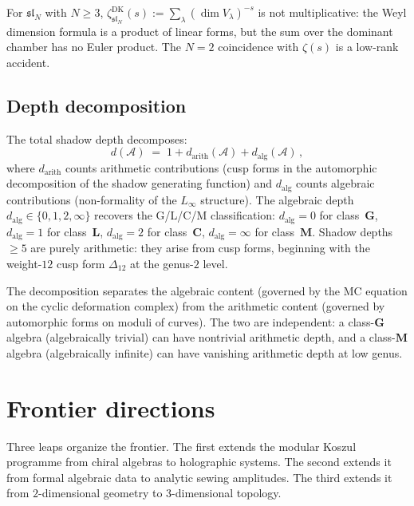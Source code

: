 \documentclass[11pt,reqno]{amsart}
\theoremstyle{definition}
\theoremstyle{remark}
\newcommand{\cA}{\mathcal{A}}
\numberwithin{equation}{section}
\begin{document}
For $\mathfrak{sl}_N$ with $N \ge 3$,
$\zeta^{\mathrm{DK}}_{\mathfrak{sl}_N}(s) :=
\sum_\lambda (\dim V_\lambda)^{-s}$ is not
multiplicative: the Weyl dimension formula is a product
of linear forms, but the sum over the dominant chamber
has no Euler product. The $N = 2$ coincidence with
$\zeta(s)$ is a low-rank accident.

\subsection{Depth decomposition}
\label{ssec:depth}

The total shadow depth decomposes:
\begin{equation}\label{eq:depth-decomposition}
d(\cA)
\;=\;
1 + d_{\mathrm{arith}}(\cA) + d_{\mathrm{alg}}(\cA)\,,
\end{equation}
where $d_{\mathrm{arith}}$ counts arithmetic contributions
(cusp forms in the automorphic decomposition of the shadow
generating function) and $d_{\mathrm{alg}}$ counts
algebraic contributions (non-formality of the $L_\infty$
structure). The algebraic depth
$d_{\mathrm{alg}} \in \{0, 1, 2, \infty\}$ recovers
the G/L/C/M classification: $d_{\mathrm{alg}} = 0$
for class~$\mathbf{G}$, $d_{\mathrm{alg}} = 1$ for
class~$\mathbf{L}$, $d_{\mathrm{alg}} = 2$ for
class~$\mathbf{C}$,
$d_{\mathrm{alg}} = \infty$ for class~$\mathbf{M}$.
Shadow depths $\ge 5$ are purely arithmetic: they arise
from cusp forms, beginning with the weight-$12$ cusp
form $\Delta_{12}$ at the genus-$2$ level.

The decomposition separates the algebraic content
(governed by the MC equation on the cyclic deformation
complex) from the arithmetic content (governed by
automorphic forms on moduli of curves). The two are
independent: a class-$\mathbf{G}$ algebra (algebraically
trivial) can have nontrivial arithmetic depth, and a
class-$\mathbf{M}$ algebra (algebraically infinite)
can have vanishing arithmetic depth at low genus.


\section{Frontier directions}
\label{sec:frontier}

Three leaps organize the frontier. The first extends the
modular Koszul programme from chiral algebras to
holographic systems. The second extends it from formal
algebraic data to analytic sewing amplitudes. The third
extends it from $2$-dimensional geometry to
$3$-dimensional topology.
\end{document}
